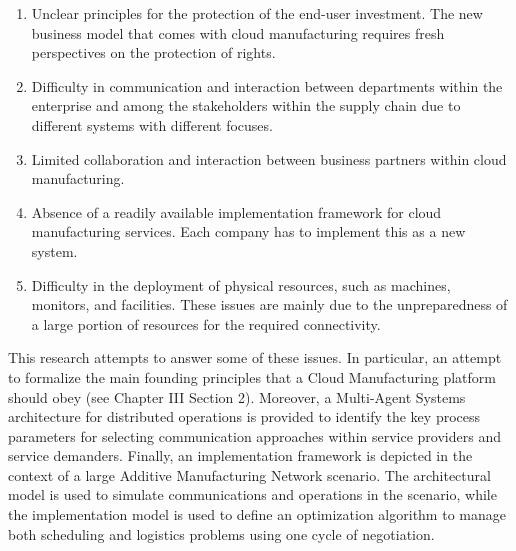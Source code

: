 \begin{enumerate}
    \item Unclear principles for the protection of the end-user investment. The new business model that comes with cloud manufacturing requires fresh perspectives on the protection of rights.
    \item Difficulty in communication and interaction between departments within the enterprise and among the stakeholders within the supply chain due to different systems with different focuses.
    \item Limited collaboration and interaction between business partners within cloud manufacturing.
    \item Absence of a readily available implementation framework for cloud manufacturing services. Each company has to implement this as a new system.
    \item Difficulty in the deployment of physical resources, such as machines, monitors, and facilities. These issues are mainly due to the unpreparedness of a large portion of resources for the required connectivity.
\end{enumerate}
This research attempts to answer some of these issues. In particular, an attempt to formalize the main founding principles that a Cloud Manufacturing platform should obey (see Chapter III Section 2). Moreover, a Multi-Agent Systems architecture for distributed operations is provided to identify the key process parameters for selecting communication approaches within service providers and service demanders. Finally, an implementation framework is depicted in the context of a large Additive Manufacturing Network scenario. The architectural model is used to simulate communications and operations in the scenario, while the implementation model is used to define an optimization algorithm to manage both scheduling and logistics problems using one cycle of negotiation.
